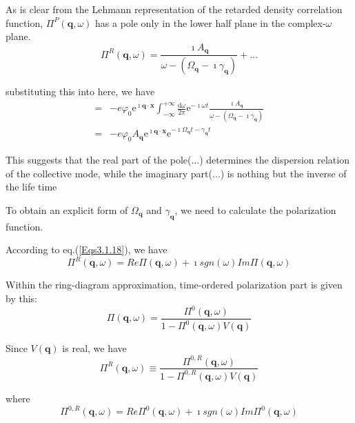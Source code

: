 As is clear from the Lehmann representation of the retarded density correlation function, $\Pi^P(\mathbf{q},\omega)$ has a pole only in the lower half plane in the complex-$\omega$ plane.
\begin{equation} \label{Eqs3.2.5}
\Pi^R(\mathbf{q},\omega) = \frac{\imath A_{\mathbf{q}}}{\omega - (\Omega_{\mathbf{q}}-\imath \gamma_{\mathbf{q}})} + \ldots
\end{equation}

substituting this into here, we have
\begin{equation} \label{Eqs3.2.6} \begin{split}
=& - e \varphi_0 \mathrm{e}^{\imath \mathbf{q} \cdot \mathbf{x}} \int_{-\infty}^{+\infty} \frac{\mathrm{d}\omega}{2\pi}\mathrm{e}^{-\imath \omega t} \frac{\imath A_{\mathbf{q}}}{\omega - (\Omega_{\mathbf{q}}-\imath \gamma_{\mathbf{q}})}\\
=& - e \varphi_0 A_{\mathbf{q}} \mathrm{e}^{\imath \mathbf{q} \cdot \mathbf{x}} \mathrm{e}^{-\imath \Omega_{\mathbf{q}} t - \gamma_{\mathbf{q}} t}
\end{split}\end{equation}

This suggests that the real part of the pole($\ldots$) determines the dispersion relation of the collective mode, while the imaginary part($\ldots$) is nothing but the inverse of the life time

To obtain an explicit form of $\Omega_{\mathbf{q}}$ and $\gamma_{\mathbf{q}}$, we need to calculate the polarization function.

According to eq.(\ref{Eqs3.1.18}), we have
\[\Pi^R(\mathbf{q},\omega) = Re\Pi(\mathbf{q},\omega) + \imath sgn(\omega) Im \Pi(\mathbf{q},\omega)\]

Within the ring-diagram approximation, time-ordered polarization part is given by this:
\begin{equation*} \label{Eqs2.8.5''} \tag{2.8.5''} \Pi(\mathbf{q},\omega) = \frac{\Pi^{0}(\mathbf{q},\omega)}{1-\Pi^{0}(\mathbf{q},\omega) V(\mathbf{q})} \end{equation*}

Since $V(\mathbf{q})$ is real, we have
\begin{equation} \label{Eqs3.2.7}
\Pi^R(\mathbf{q},\omega) \equiv \frac{\Pi^{0,R}(\mathbf{q},\omega)}{1-\Pi^{0,R}(\mathbf{q},\omega)V(\mathbf{q})}
\end{equation}

where
\[\Pi^{0,R}(\mathbf{q},\omega) = Re\Pi^0(\mathbf{q},\omega) + \imath sgn(\omega) Im \Pi^0(\mathbf{q},\omega)\]

